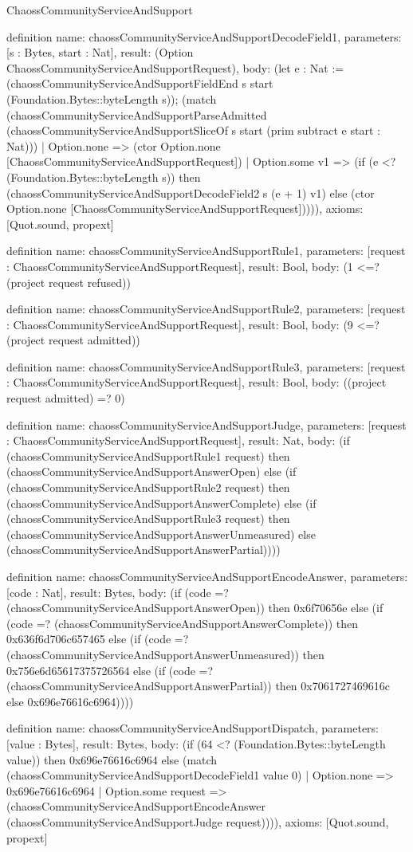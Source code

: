 \begin{lexlean}{ChaossCommunityServiceAndSupport}
\begin{semanticmodule}
definition{
  name: chaossCommunityServiceAndSupportDecodeField1,
  parameters: [s : Bytes, start : Nat],
  result: (Option ChaossCommunityServiceAndSupportRequest),
  body: (let e : Nat := (chaossCommunityServiceAndSupportFieldEnd s start (Foundation.Bytes::byteLength s)); (match (chaossCommunityServiceAndSupportParseAdmitted (chaossCommunityServiceAndSupportSliceOf s start (prim subtract e start : Nat)))
    | Option.none => (ctor Option.none [ChaossCommunityServiceAndSupportRequest])
    | Option.some v1 => (if (e <? (Foundation.Bytes::byteLength s)) then (chaossCommunityServiceAndSupportDecodeField2 s (e + 1) v1) else (ctor Option.none [ChaossCommunityServiceAndSupportRequest])))),
  axioms: [Quot.sound, propext]
}

definition{
  name: chaossCommunityServiceAndSupportRule1,
  parameters: [request : ChaossCommunityServiceAndSupportRequest],
  result: Bool,
  body: (1 <=? (project request refused))
}

definition{
  name: chaossCommunityServiceAndSupportRule2,
  parameters: [request : ChaossCommunityServiceAndSupportRequest],
  result: Bool,
  body: (9 <=? (project request admitted))
}

definition{
  name: chaossCommunityServiceAndSupportRule3,
  parameters: [request : ChaossCommunityServiceAndSupportRequest],
  result: Bool,
  body: ((project request admitted) =? 0)
}

definition{
  name: chaossCommunityServiceAndSupportJudge,
  parameters: [request : ChaossCommunityServiceAndSupportRequest],
  result: Nat,
  body: (if (chaossCommunityServiceAndSupportRule1 request) then (chaossCommunityServiceAndSupportAnswerOpen) else (if (chaossCommunityServiceAndSupportRule2 request) then (chaossCommunityServiceAndSupportAnswerComplete) else (if (chaossCommunityServiceAndSupportRule3 request) then (chaossCommunityServiceAndSupportAnswerUnmeasured) else (chaossCommunityServiceAndSupportAnswerPartial))))
}

definition{
  name: chaossCommunityServiceAndSupportEncodeAnswer,
  parameters: [code : Nat],
  result: Bytes,
  body: (if (code =? (chaossCommunityServiceAndSupportAnswerOpen)) then 0x6f70656e else (if (code =? (chaossCommunityServiceAndSupportAnswerComplete)) then 0x636f6d706c657465 else (if (code =? (chaossCommunityServiceAndSupportAnswerUnmeasured)) then 0x756e6d65617375726564 else (if (code =? (chaossCommunityServiceAndSupportAnswerPartial)) then 0x7061727469616c else 0x696e76616c6964))))
}

definition{
  name: chaossCommunityServiceAndSupportDispatch,
  parameters: [value : Bytes],
  result: Bytes,
  body: (if (64 <? (Foundation.Bytes::byteLength value)) then 0x696e76616c6964 else (match (chaossCommunityServiceAndSupportDecodeField1 value 0)
    | Option.none => 0x696e76616c6964
    | Option.some request => (chaossCommunityServiceAndSupportEncodeAnswer (chaossCommunityServiceAndSupportJudge request)))),
  axioms: [Quot.sound, propext]
}
\end{semanticmodule}
\end{lexlean}
